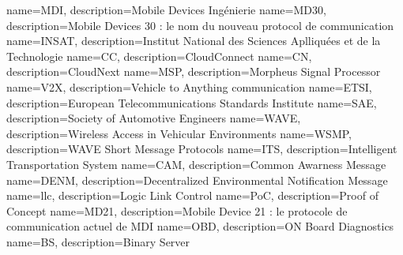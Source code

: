  {
	name=MDI,
	description={Mobile Devices Ingénierie}
}
 {
	name=MD30,
	description={Mobile Devices 30 : le nom du nouveau protocol de communication }
}
 {
	name=INSAT,
	description={Institut National des Sciences Aplliquées et de la Technologie}
}
 {
	name=CC,
	description={CloudConnect}
}
 {
	name=CN,
	description={CloudNext}
}
 {
	name=MSP,
	description={Morpheus Signal Processor}
}
 {
	name=V2X,
	description={Vehicle to Anything communication}
}
 {
	name=ETSI,
	description={European Telecommunications Standards Institute}
}
 {
	name=SAE,
	description={Society of Automotive Engineers}
}
 {
	name=WAVE,
	description={Wireless Access in Vehicular Environments}
}
 {
	name=WSMP,
	description={WAVE Short Message Protocols}
}
 {
	name=ITS,
	description={Intelligent Transportation System}
}
 {
	name=CAM,
	description={Common Awarness Message}
}
 {
	name=DENM,
	description={Decentralized Environmental Notification Message}
}
 {
	name=llc,
	description={Logic Link Control}
}
 {
	name=PoC,
	description={Proof of Concept}
}
 {
	name=MD21,
	description={Mobile Device 21 : le protocole de communication actuel de MDI}
}
 {
	name=OBD,
	description={ON Board Diagnostics}
}
 {
	name=BS,
	description={Binary Server}
}

